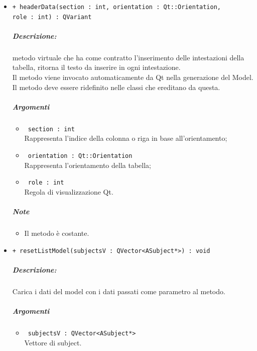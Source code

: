 {\begin{itemize}
\begin{itemize}
			\item \color{RoyalPurple}\verb! role : int!\\
			\color{black}Regola di visualizzazione Qt\g{}.
		\end{itemize}
	\subparagraph{Note}
			\begin{itemize}
				\item Il metodo è costante.
			\end{itemize}
		
	\item \color{blue}\verb!+ headerData(section : int, orientation : Qt::Orientation,!\\
	  \verb!role : int) : QVariant!\\
	\color{black}
	\subparagraph{Descrizione:} metodo virtuale che ha come contratto l'inserimento delle intestazioni della tabella, ritorna il testo da inserire in ogni intestazione.\\
	Il metodo viene invocato automaticamente da Qt\g{} nella generazione del Model.\\
	Il metodo deve essere ridefinito nelle classi che ereditano da questa.\\
	\subparagraph{Argomenti}
		\begin{itemize}
			\item \color{RoyalPurple}\verb! section : int!\\
			\color{black}Rappresenta l'indice della colonna o riga in base all'orientamento;
			
			\item \color{RoyalPurple}\verb! orientation : Qt::Orientation!\\
			\color{black}Rappresenta l'orientamento della tabella;
			
			\item \color{RoyalPurple}\verb! role : int!\\
			\color{black}Regola di visualizzazione Qt\g{}.
		\end{itemize}
	\subparagraph{Note}
			\begin{itemize}
				\item Il metodo è costante.
			\end{itemize}
		
	\item \color{blue}\verb!+ resetListModel(subjectsV : QVector<ASubject*>) : void!\\
		\color{black}
		\subparagraph{Descrizione:} Carica i dati del model con i dati passati come parametro al metodo.\\
		\subparagraph{Argomenti}
			\begin{itemize}				
				\item \color{RoyalPurple}\verb! subjectsV : QVector<ASubject*>!\\
				\color{black} Vettore di subject\g{}.
			\end{itemize}
			

\end{itemize}}
